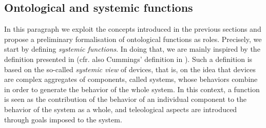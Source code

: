 \documentclass[sw]{iosart2x}
\newcommand{\firstTimeKeyWord}[1]{\textit{#1}}
\newcommand{\myComment}[1]{{\unskip \ignorespaces}}
\begin{document}


\subsection{Ontological and systemic functions}
In this paragraph we exploit the concepts introduced in the previous sections and propose a preliminary formalisation of ontological functions as roles. 
Precisely, we start by defining \firstTimeKeyWord{systemic functions}. In doing that, we are mainly inspired by the definition presented in \cite{mizoguchiUnifyingDefinitionArtifact2016} (cfr. also Cummings' definition in \cite{cumminsFunctionalAnalysis1975}).
Such a definition is based on the so-called \firstTimeKeyWord{systemic view} of devices, that is, on the idea that devices are complex aggregates of components, called systems, whose behaviors combine in order to generate the  behavior of the whole system. 
In this context, a function is seen as the contribution of the behavior of an individual component to the behavior of the system as a whole, and teleological aspects are introduced through goals imposed to \myComment{selected for} the system.  


\end{document}
